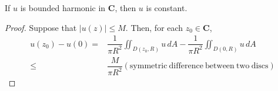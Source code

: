 \begin{thm}
If $u$ is bounded harmonic in ${\bm C}$, then $u$ is constant.
\end{thm}
\vspace{2ex}
\begin{proof}
Suppose that $|u(z)|\leq M$. Then, for each $z_0\in {\bm C}$, 
\begin{align*}
u(z_0)-u(0)=&\dfrac{1}{\pi R^2}\iint_{D(z_0,R)}u\,dA-\dfrac{1}{\pi R^2}\iint_{D(0,R)}u\,dA\\
\leq &\dfrac{M}{\pi R^2}(\mathrm{symmetric\ difference\ between\ two\ discs}) 
\end{align*}
\end{proof}
\vspace{2ex}

